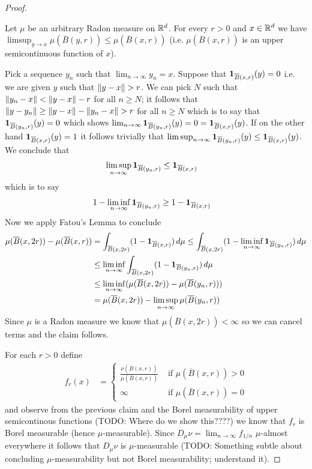 \begin{proof}
\begin{clm}Let $\mu$ be an arbitrary Radon measure on $\mathbb{R}^d$.  For every $r>0$ and $x \in \mathbb{R}^d$ we have $\limsup_{y \to x} \mu(\overline{B}(y, r)) \leq \mu(\overline{B}(x, r))$ (i.e. $\mu(\overline{B}(x,r))$ is an upper semicontinuous function of $x$).
\end{clm}
Pick a sequence $y_n$ such that $\lim_{n \to \infty} y_n = x$.  Suppose that $\textbf{1}_{\overline{B}(x,r)}(y) = 0$ i.e. we are given $y$ such that $\left \lVert y-x \right \rVert>r$.  We can pick $N$ such that $\left \lVert y_n-x \right \rVert < \left \lVert y-x \right \rVert-r$ for all $n \geq N$; it follows that $\left \lVert y-y_n \right \rVert \geq \left \lVert y-x \right \rVert - \left \lVert y_n-x \right \rVert > r$ for all $n \geq N$ which is to say that $\textbf{1}_{\overline{B}(y_n,r)}(y) = 0$ which shows $\lim_{n \to \infty} \textbf{1}_{\overline{B}(y_n,r)}(y) = 0 = \textbf{1}_{\overline{B}(x,r)}(y)$.  If on the other hand $\textbf{1}_{\overline{B}(x,r)}(y)=1$ it follows trivially that $\limsup_{n \to \infty} \textbf{1}_{\overline{B}(y_n,r)}(y) \leq \textbf{1}_{\overline{B}(x,r)}(y)$.  We conclude that
\begin{align*}
\limsup_{n \to \infty} \textbf{1}_{\overline{B}(y_n,r)} &\leq \textbf{1}_{\overline{B}(x,r)}
\end{align*}
which is to say 
\begin{align*}
1 - \liminf_{n \to \infty} \textbf{1}_{\overline{B}(y_n,r)} &\geq 1 - \textbf{1}_{\overline{B}(x,r)}
\end{align*}
Now we apply Fatou's Lemma to conclude
\begin{align*}
\mu(\overline{B}(x,2r)) - \mu(\overline{B}(x,r)) 
&= \int_{\overline{B}(x, 2r)} (1- \textbf{1}_{\overline{B}(x,r)}) \, d\mu 
\leq \int_{\overline{B}(x, 2r)} (1 - \liminf_{n \to \infty} \textbf{1}_{\overline{B}(y_n,r)}) \, d\mu \\
&\leq \liminf_{n \to \infty} \int_{\overline{B}(x, 2r)} (1 - \textbf{1}_{\overline{B}(y_n,r)}) \, d\mu \\
&\leq \liminf_{n \to \infty} ( \mu(\overline{B}(x, 2r)) - \mu(\overline{B}(y_n,r))) \\
&= \mu(\overline{B}(x, 2r)) - \limsup_{n \to \infty} \mu(\overline{B}(y_n,r)) 
\end{align*}
Since $\mu$ is a Radon measure we know that $\mu(\overline{B}(x, 2r))<\infty$ so we can cancel terms and the claim follows.

For each $r > 0$ define
\begin{align*}
f_r(x) &= \begin{cases}
\frac{\nu(\overline{B}(x,r))}{\mu(\overline{B}(x,r))} & \text{ if $\mu(\overline{B}(x,r))>0$} \\
\infty & \text{ if $\mu(\overline{B}(x,r))=0$} 
\end{cases}
\end{align*}
and observe from the previous claim and the Borel measurability of upper semicontinous functions (TODO: Where do we show this????) we know that $f_r$ is Borel measurable (hence $\mu$-measurable).  Since $D_\mu \nu = \lim_{n \to \infty} f_{1/n}$ $\mu$-almost everywhere it follows that $D_\mu \nu$ is $\mu$-measurable (TODO:  Something subtle about concluding $\mu$-measurability but not Borel measurability; understand it).


\end{proof}
